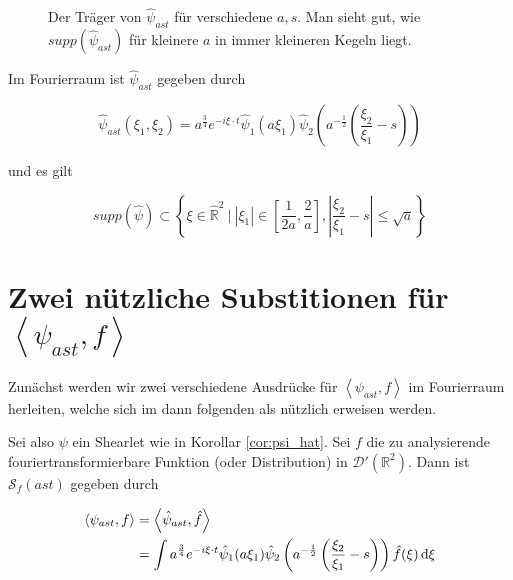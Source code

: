 \begin{remark}

\begin{figure}[h]
\centering

\caption{Der Träger von $\hat \psi_{ast}$ für verschiedene $a, s$. Man sieht gut,
wie $supp (\hat \psi_{ast})$ für kleinere $a$ in immer kleineren Kegeln liegt.}
\end{figure}

\label{cor:psi_hat}
Im Fourierraum ist $\hat{\psi}_{ast}$ gegeben durch

\begin{equation}
    \hat \psi_{ast}{(\xi_1, \xi_2)} = a^{\frac{3}{4}}e^{-i\xi \cdot t}\hat\psi_1(a \xi_1) \hat\psi_{2}\left(a^{-\frac{1}{2}}\left(\frac{\xi_2}{\xi_1}-s\right)\right)
\end{equation}

und es gilt

\begin{equation}
\label{eq:supp_psi}
    supp(\hat \psi) \subset \left\{\xi \in  \hat{\mathbb{R}}^2 ~\Big| ~|\xi_1| \in \left[\frac{1}{2 a} , \frac{2}{a}\right], \left|\frac{\xi_2}{\xi_1} - s\right| \leq \sqrt{a} \right\}
\end{equation}

\end{remark}





\section{\texorpdfstring{Zwei nützliche Substitionen für  $\left<\psi_{ast}, f\right>$}{zwei nützliche Substitutionen}}
\label{sec:substitutionen}

Zunächst werden wir zwei verschiedene Ausdrücke für $\left<\psi_{ast}, f\right>$
im Fourierraum herleiten, welche sich im dann folgenden als nützlich erweisen werden.

Sei also $\psi$ ein Shearlet wie in Korollar \ref{cor:psi_hat}. Sei $f$ die zu
analysierende fouriertransformierbare Funktion (oder Distribution) in
$\mathcal{D} \prime (\mathbb{R}^2)$. Dann ist $\mathcal{S}_f (ast)$ gegeben durch

\begin{align*}
\left< \psi_{ast}, f \right> &= \left<\hat\psi_{ast}, \hat f\right> \\
 &= \int a^{\frac{3}{4}} e^{-i \xi \cdot t} \hat \psi_1(a \xi_1)
    \hat \psi_2 \left(a^{-\frac{1}{2}} \left(\frac{\xi_2}{\xi_1} - s\right)\right)
    \hat f (\xi) \mathop{}\!\mathrm{d} \xi
\end{align*}

